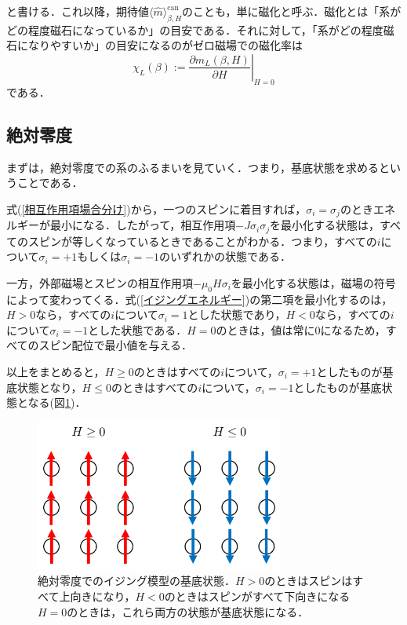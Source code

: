 \documentclass[a4paper,11pt]{jsreport}
\begin{document}
と書ける．これ以降，期待値$\langle \hat{m} \rangle_{\beta, H}^{\text{can}}$のことも，単に磁化と呼ぶ．磁化とは「系がどの程度磁石になっているか」の目安である．それに対して，「系がどの程度磁石になりやすいか」の目安になるのがゼロ磁場での磁化率は
\begin{equation}
  \chi_L(\beta) := \left.\frac{\partial m_L(\beta, H)}{\partial H}\right|_{H=0}
\end{equation}
である．
\subsection{絶対零度}
まずは，絶対零度での系のふるまいを見ていく．つまり，基底状態を求めるということである．\par
式(\ref{相互作用項場合分け})から，一つのスピンに着目すれば，$\sigma_i = \sigma_j$のときエネルギーが最小になる．したがって，相互作用項$-J\sigma_i \sigma_j$を最小化する状態は，すべてのスピンが等しくなっているときであることがわかる．つまり，すべての$i$について$\sigma_i = +1$もしくは$\sigma_i = -1$のいずれかの状態である．\par
一方，外部磁場とスピンの相互作用項$-\mu_0 H \sigma_i$を最小化する状態は，磁場の符号によって変わってくる．式(\ref{イジングエネルギー})の第二項を最小化するのは，$H>0$なら，すべての$i$について$\sigma_i=1$とした状態であり，$H<0$なら，すべての$i$について$\sigma_i=-1$とした状態である．$H=0$のときは，値は常に$0$になるため，すべてのスピン配位で最小値を与える．\par
以上をまとめると，$H \geq 0$のときはすべての$i$について，$\sigma_i=+1$としたものが基底状態となり，$H \leq 0$のときはすべての$i$について，$\sigma_i=-1$としたものが基底状態となる(図\ref{絶対零度スピン配位})．\par
\begin{figure}[h]
  \begin{center}
    \includegraphics[height=5cm]{image/絶対零度スピン配位.png}
    \caption{絶対零度でのイジング模型の基底状態．$H>0$のときはスピンはすべて上向きになり，$H<0$のときはスピンがすべて下向きになる$H=0$のときは，これら両方の状態が基底状態になる． \label{絶対零度スピン配位}}
  \end{center}
\end{figure}
\end{document}
